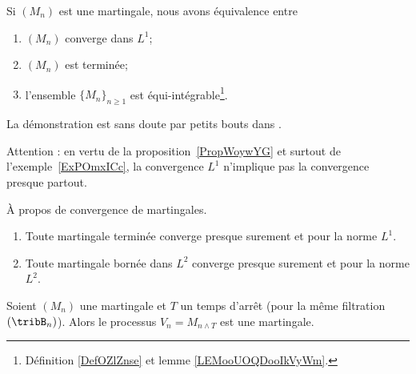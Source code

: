 \begin{theorem} \label{ThoEFbpVXb}
	Si \( (M_n)\) est une martingale, nous avons équivalence entre
	\begin{enumerate}
		\item
		      \( (M_n)\) converge dans \( L^1\);
		\item
		      \( (M_n)\) est terminée;
		\item
		      l'ensemble \( \{ M_n \}_{n\geq 1}\) est équi-intégrable\footnote{Définition \ref{DefOZlZnse} et lemme \ref{LEMooUOQDooIkVyWm}.}.
	\end{enumerate}
\end{theorem}

La démonstration est sans doute par petits bouts dans \cite{BIBooYWQKooSdwvTG}.

Attention : en vertu de la proposition~\ref{PropWoywYG} et surtout de l'exemple~\ref{ExPOmxICc}, la convergence \( L^1\) n'implique pas la convergence presque partout.

\begin{theorem}   \label{ThoHBvnTRk}
	À propos de convergence de martingales.
	\begin{enumerate}
		\item
		      Toute martingale terminée converge presque surement et pour la norme \( L^1\).
		\item
		      Toute martingale bornée dans \( L^2\) converge presque surement et pour la norme \( L^2\).
	\end{enumerate}
\end{theorem}


\begin{proposition} \label{PropAYJpGsc}
	Soient \( (M_n)\) une martingale et \( T\) un temps d'arrêt (pour la même filtration \( (\tribB_n)\)). Alors le processus \( V_n=M_{n\wedge T}\) est une martingale.
\end{proposition}

